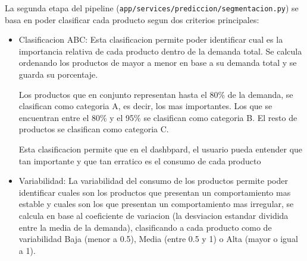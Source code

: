 La segunda etapa del pipeline (\texttt{app/services/prediccion/segmentacion.py}) se basa en poder clasificar cada producto segun dos criterios principales:

\begin{itemize}
    \item Clasificacion ABC: Esta clasificacion permite poder identificar cual es la importancia relativa de cada producto dentro de la demanda total. Se calcula ordenando los productos de mayor a menor en base a su demanda total y se guarda su porcentaje. 
    
    Los productos que en conjunto representan hasta el 80\% de la demanda, se clasifican como categoria A, es decir, los mas importantes. Los que se encuentran entre el 80\% y el 95\% se clasifican como categoria B. El resto de productos se clasifican como categoria C.
    
    Esta clasificacion permite que en el dashbpard, el usuario pueda entender que tan importante y que tan erratico es el consumo de cada producto 
    
    \item Variabilidad: La variabilidad del consumo de los productos permite poder identificar cuales son los productos que presentan un comportamiento mas estable y cuales son los que presentan un comportamiento mas irregular, se calcula en base al coeficiente de variacion (la desviacion estandar dividida entre la media de la demanda), clasificando a cada producto como de variabilidad Baja (menor a 0.5), Media (entre 0.5 y 1) o Alta (mayor o igual a 1).

\end{itemize}

